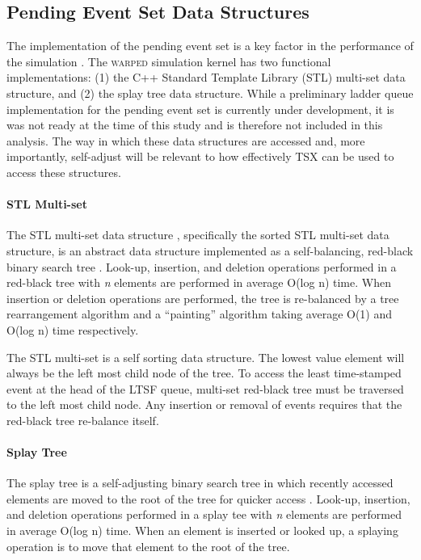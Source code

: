 \documentclass[11pt]{book}
\begin{document}

\subsection{Pending Event Set Data Structures}

The implementation of the pending event set is a key factor in the performance of the
simulation \cite{twpes}.  The \textsc{warped} simulation kernel has two functional
implementations: (1) the C++ Standard Template Library (STL) multi-set data structure, and
(2) the splay tree data structure.  While a preliminary ladder queue \cite{tang-05}
implementation for the pending event set is currently under development, it is was not ready
at the time of this study and is therefore not included in this analysis.  The way in
which these data structures are accessed and, more importantly, self-adjust will be
relevant to how effectively TSX can be used to access these structures.

\paragraph{STL Multi-set}

The STL multi-set data structure , specifically the sorted STL multi-set data structure,
is an abstract data structure implemented as a self-balancing, red-black binary search
tree \cite{redblack}.  Look-up, insertion, and deletion operations performed in a
red-black tree with \emph{n} elements are performed in average O(log n) time.  When
insertion or deletion operations are performed, the tree is re-balanced by a tree
rearrangement algorithm and a ``painting'' algorithm taking average O(1) and O(log n) time
respectively.

The STL multi-set is a self sorting data structure.  The lowest value element will always
be the left most child node of the tree.  To access the least time-stamped event at the
head of the LTSF queue, multi-set red-black tree must be traversed to the left most child
node.  Any insertion or removal of events requires that the red-black tree re-balance
itself.

\paragraph{Splay Tree}

The splay tree is a self-adjusting binary search tree in which recently accessed elements
are moved to the root of the tree for quicker access \cite{splaytree}.  Look-up,
insertion, and deletion operations performed in a splay tee with \emph{n} elements are
performed in average O(log n) time.  When an element is inserted or looked up, a splaying
operation is to move that element to the root of the tree.
\end{document}
